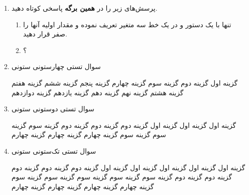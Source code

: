 \documentclass[a4paper,12pt]{unistyle}
\begin{document}
\MakeTitle
\begin{enumerate}

    \item
    پرسش‌های زیر را در \textbf{همین برگه} پاسخی کوتاه دهید. 
    \begin{enumerate}[itemtwocol]
        \parskip=20pt
        \item تنها با یک دستور و  در یک خط سه متغیر تعریف نموده و مقدار اولیه آنها را صفر قرار دهید.
        \item {}؟
    \end{enumerate}


    \item سوال تستی چهارستونی ستونی       
        \begin{multiplechoices}
            \choice گزینه اول
            \choice گزینه دوم
            \choice گزینه سوم
            \choice گزینه چهارم
            \choice گزینه پنجم
            \choice گزینه ششم
            \choice گزینه هفتم
            \choice گزینه هشتم
            \choice گزینه نهم
            \choice گزینه دهم
            \choice گزینه یازدهم
            \choice گزینه دوازدهم
        \end{multiplechoices}

        \item سوال تستی دوستونی ستونی
        \begin{multiplechoices}
            \choice گزینه اول  گزینه اول گزینه اول
            \choice گزینه دوم  گزینه دوم گزینه دوم
            \choice گزینه سوم  گزینه سوم گزینه سوم
            \choice گزینه چهارم گزینه چهارم گزینه چهارم
        \end{multiplechoices}

    \item سوال تستی تک‌ستونی ستونی
        \begin{multiplechoices}
            \choice گزینه اول گزینه اول گزینه اول گزینه اول گزینه اول
            \choice گزینه دوم گزینه دوم گزینه دوم گزینه دوم گزینه دوم
            \choice گزینه سوم گزینه سوم گزینه سوم گزینه سوم گزینه سوم
            \choice گزینه چهارم گزینه چهارم گزینه چهارم گزینه چهارم
        \end{multiplechoices}
\end{enumerate}


\sign
\vfill
\kalamehakim
\xepersianproof
\end{document}
